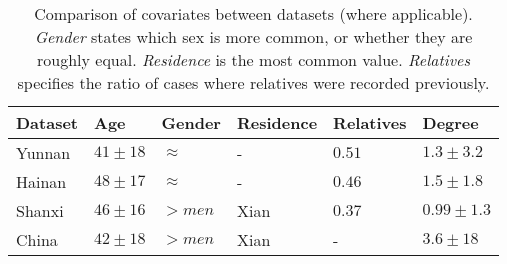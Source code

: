 \begin{table}
	\begin{tabularx}{\linewidth}{XXXXXX}
		\hline
		\textbf{Dataset} & \textbf{Age} & \textbf{Gender} & \textbf{Residence} & \textbf{Relatives} & \textbf{Degree}\\
		\hline
		Yunnan & $41\pm18$ & $\approx$ & - & $0.51$ & $1.3\pm3.2$\\
		Hainan & $48\pm17$ & $\approx$ & - & $0.46$ & $1.5\pm1.8$\\
		Shanxi & $46\pm16$ & $>men$ & Xian & $0.37$ & $0.99\pm1.3$\\
		China & $42\pm18$ & $>men$ & Xian & - & $3.6\pm18$\\
		\hline
	\end{tabularx}
	\caption{Comparison of covariates between datasets (where applicable). \emph{Gender} states which sex is more common, or whether they are roughly equal. \emph{Residence} is the most common value. \emph{Relatives} specifies the ratio of cases where relatives were recorded previously.}
	\label{tab:cov_comp}
\end{table}
